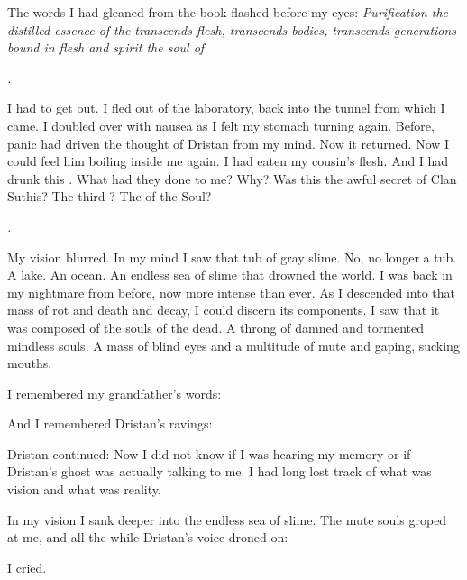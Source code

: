 \documentclass
  [a4paper,
   12pt,
   oneside
  ]%
  {article}
\begin{document}
The words I had gleaned from the book flashed before my eyes:
\emph{%
  Purification\prikker 
  the distilled essence of \Ubloth\prikker 
  the \nexus transcends flesh, transcends bodies, transcends generations\prikker
  bound in flesh and spirit\prikker 
  the soul of \Ubloth\prikker}

\emph{\Ubloth.}

I had to get out. 
I fled out of the laboratory, back into the tunnel from which I came. 
I doubled over with nausea as I felt my stomach turning again.
Before, panic had driven the thought of Dristan from my mind. 
Now it returned. 
Now I could feel him boiling inside me again. 
I had eaten my cousin's flesh.
And I had drunk this .
What had they done to me?
Why? 
Was this the awful secret of Clan Suthis?
The third \Arcanum?
The \Arcanum of the Soul?

\emph{\Ubloth.}

My vision blurred. 
In my mind I saw that tub of gray slime. 
No, no longer a tub. 
A lake. 
An ocean. 
An endless sea of slime that drowned the world. 
I was back in my nightmare from before, now more intense than ever. 
As I descended into that mass of rot and death and decay, I could discern its components.
I saw that it was composed of the souls of the dead. 
A throng of damned and tormented mindless souls. 
A mass of blind eyes and a multitude of mute and gaping, sucking mouths.

I remembered my grandfather's words: 

And I remembered Dristan's ravings: 

Dristan continued: 
Now I did not know if I was hearing my memory or if Dristan's ghost was actually talking to me.
I had long lost track of what was vision and what was reality.

In my vision I sank deeper into the endless sea of slime. 
The mute souls groped at me, and all the while Dristan's voice droned on: 

 I cried. 
\end{document}
